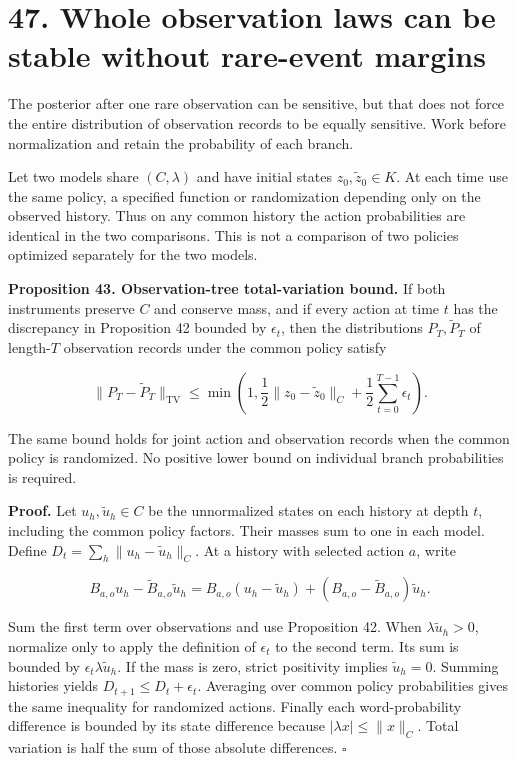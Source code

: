 \documentclass[11pt,letterpaper]{article}
\begin{document}
\section{47. Whole observation laws can be stable without rare-event
margins}\label{whole-observation-laws-can-be-stable-without-rare-event-margins}

The posterior after one rare observation can be sensitive, but that does
not force the entire distribution of observation records to be equally
sensitive. Work before normalization and retain the probability of each
branch.

Let two models share \((C,\lambda)\) and have initial states
\(z_0,\widetilde z_0\in K\). At each time use the same policy, a
specified function or randomization depending only on the observed
history. Thus on any common history the action probabilities are
identical in the two comparisons. This is not a comparison of two
policies optimized separately for the two models.

\textbf{Proposition 43. Observation-tree total-variation bound.} If both
instruments preserve \(C\) and conserve mass, and if every action at
time \(t\) has the discrepancy in Proposition 42 bounded by
\(\epsilon_t\), then the distributions \(P_T,\widetilde P_T\) of
length-\(T\) observation records under the common policy satisfy

\[
\boxed{
\|P_T-\widetilde P_T\|_{\mathrm{TV}}
\leq\min\left(1,\frac12\|z_0-\widetilde z_0\|_C
+\frac12\sum_{t=0}^{T-1}\epsilon_t\right).
}
\]

The same bound holds for joint action and observation records when the
common policy is randomized. No positive lower bound on individual
branch probabilities is required.

\textbf{Proof.} Let \(u_h,\widetilde u_h\in C\) be the unnormalized
states on each history at depth \(t\), including the common policy
factors. Their masses sum to one in each model. Define
\(D_t=\sum_h\|u_h-\widetilde u_h\|_C\). At a history with selected
action \(a\), write

\[
B_{a,o}u_h-\widetilde B_{a,o}\widetilde u_h
=B_{a,o}(u_h-\widetilde u_h)
+(B_{a,o}-\widetilde B_{a,o})\widetilde u_h.
\]

Sum the first term over observations and use Proposition 42. When
\(\lambda\widetilde u_h>0\), normalize only to apply the definition of
\(\epsilon_t\) to the second term. Its sum is bounded by
\(\epsilon_t\lambda\widetilde u_h\). If the mass is zero, strict
positivity implies \(\widetilde u_h=0\). Summing histories yields
\(D_{t+1}\leq D_t+\epsilon_t\). Averaging over common policy
probabilities gives the same inequality for randomized actions. Finally
each word-probability difference is bounded by its state difference
because \(|\lambda x|\leq\|x\|_C\). Total variation is half the sum of
those absolute differences. \(\square\)
\end{document}
